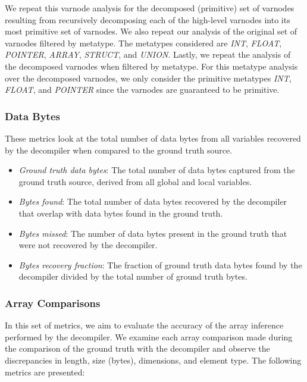 \documentclass[conference]{IEEEtran}
\begin{document}
We repeat this varnode analysis for the decomposed (primitive) set of varnodes resulting from recursively decomposing each of the high-level varnodes into its most primitive set of varnodes. We also repeat our analysis of the original set of varnodes filtered by metatype. The metatypes considered are \emph{INT}, \emph{FLOAT}, \emph{POINTER}, \emph{ARRAY}, \emph{STRUCT}, and \emph{UNION}. Lastly, we repeat the analysis of the decomposed varnodes when filtered by metatype. For this metatype analysis over the decomposed varnodes, we only consider the primitive metatypes \emph{INT}, \emph{FLOAT}, and \emph{POINTER} since the varnodes are guaranteed to be primitive.

\subsubsection{Data Bytes}

These metrics look at the total number of data bytes from all variables recovered by the decompiler when compared to the ground truth source.

\begin{itemize}
    \item \emph{Ground truth data bytes}: The total number of data bytes captured from the ground truth source, derived from all global and local variables.
    \item \emph{Bytes found}: The total number of data bytes recovered by the decompiler that overlap with data bytes found in the ground truth.
    \item \emph{Bytes missed}: The number of data bytes present in the ground truth that were not recovered by the decompiler.
    \item \emph{Bytes recovery fraction}: The fraction of ground truth data bytes found by the decompiler divided by the total number of ground truth bytes.
\end{itemize}

\subsubsection{Array Comparisons}

In this set of metrics, we aim to evaluate the accuracy of the array inference performed by the decompiler. We examine each array comparison made during the comparison of the ground truth with the decompiler and observe the discrepancies in length, size (bytes), dimensions, and element type. The following metrics are presented:
\end{document}
